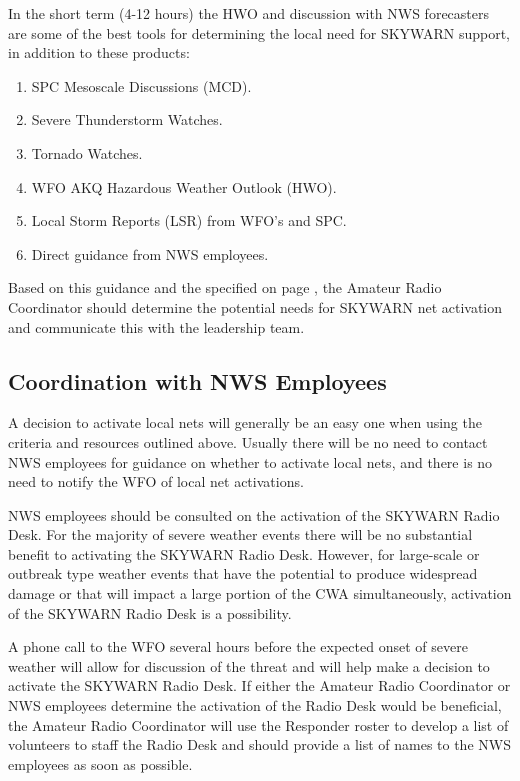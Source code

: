 \documentclass[pdflatex,letterpaper,twoside,12pt]{book}
\begin{document}
In the short term (4-12 hours) the HWO and discussion with NWS forecasters are some of the best tools for determining the local need for SKYWARN support, in addition to these products:

\begin{enumerate}
\item SPC Mesoscale Discussions (MCD).
\item Severe Thunderstorm Watches.
\item Tornado Watches.
\item WFO AKQ Hazardous Weather Outlook (HWO).
\item Local Storm Reports (LSR) from WFO's and SPC.
\item Direct guidance from NWS employees.
\end{enumerate}

Based on this guidance and the  specified on page \pageref{activation-criteria}, the Amateur Radio Coordinator should determine the potential needs for SKYWARN net activation and communicate this with the leadership team.

\subsection{Coordination with NWS Employees}

A decision to activate local nets will generally be an easy one when using the criteria and resources outlined above.  Usually there will be no need to contact NWS employees for guidance on whether to activate local nets, and there is no need to notify the WFO of local net activations.

NWS employees should be consulted on the activation of the SKYWARN Radio Desk.  For the majority of severe weather events there will be no substantial benefit to activating the SKYWARN Radio Desk.  However, for large-scale or outbreak type weather events that have the potential to produce widespread damage or that will impact a large portion of the CWA simultaneously, activation of the SKYWARN Radio Desk is a possibility.

A phone call to the WFO several hours before the expected onset of severe weather will allow for discussion of the threat and will help make a decision to activate the SKYWARN Radio Desk. If either the Amateur Radio Coordinator or NWS employees determine the activation of the Radio Desk would be beneficial, the Amateur Radio Coordinator will use the Responder roster to develop a list of volunteers to staff the Radio Desk and should provide a list of names to the NWS employees as soon as possible.
\end{document}
